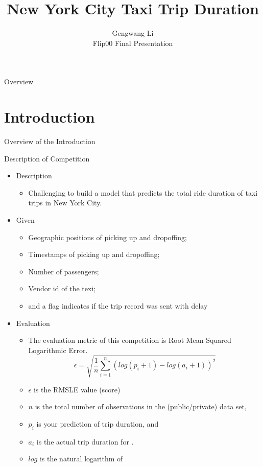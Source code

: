 \documentclass[
 size=12pt,
 paper=smartboard, %
 mode=present, %
 display=slides, %
style=tuliplab,
pauseslide,
fleqn,leqno]{powerdot}
\title{New York City Taxi Trip Duration}
\author{
Gengwang Li
\\
Flip00 Final Presentation
}
\date{\gitCommitterDate}
\begin{document}
\maketitle 

\begin{slide}[toc=,bm=]{Overview}
\tableofcontents[content=sections]
\end{slide}


\section{Introduction}

\begin{slide}[toc=,bm=]{Overview of the Introduction}
\tableofcontents[content=currentsection,type=0]
\end{slide}

\begin{slide}{Description of Competition}
  \begin{itemize}
    \item Description \pause
    \begin{itemize}
      \item Challenging to build a model that predicts the total ride duration of taxi trips in New York City.
    \end{itemize} \pause
    \item Given \pause
    \begin{itemize}
      \item Geographic positions of picking up and dropoffing;
      \item Timestamps of picking up and dropoffing;
      \item Number of passengers;
      \item Vendor id of the texi;
      \item and a flag indicates if the trip record was sent with delay
    \end{itemize} \pause
    \item Evaluation \pause
    \begin{itemize}
      \item The evaluation metric of this competition is Root Mean Squared Logarithmic Error.
      $$
      \epsilon = \sqrt{\frac{1}{n} \sum_{i=1}^{n}{(log(p_i + 1) - log(a_i + 1))^2}}
      $$ 
      \pause
      \item $\epsilon$ is the RMSLE value (score)
      \item $n$ is the total number of observations in the (public/private) data set,
      \item $p_i$ is your prediction of trip duration, and
      \item $a_i$ is the actual trip duration for . 
      \item $log$ is the natural logarithm of 
    \end{itemize} 
  \end{itemize}
\end{slide}
\end{document}
